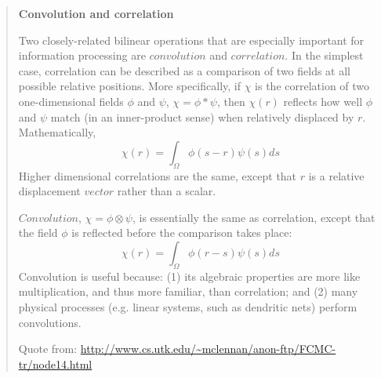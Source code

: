 
\begin{quote}
{\sffamily\bfseries
Convolution and correlation}

Two closely-related bilinear operations that are especially important
for information processing are $convolution$ and
$correlation$. In the simplest case, correlation can
be described as a comparison of two fields at all possible relative
positions. More specifically, if $\chi$
is the correlation of two one-dimensional fields $\phi$
and $\psi$, $\chi = \phi*\psi$, then $\chi(r)$ reflects how well 
$\phi$ and $\psi$ match (in an inner-product sense) when relatively displaced by
$r$. Mathematically, 
\[
\chi(r)=\int_{\Omega }^{} \phi(s-r)\psi (s)ds
\]
Higher dimensional correlations are the same, except that $r$ is
a relative displacement $vector$ rather than a scalar. 

$Convolution$, $\chi=\phi\otimes \psi$, is essentially the same as correlation, except that the field $\phi$ is reflected before the comparison takes place: 
\[
\chi(r)=\int_{\Omega }^{}  \phi(r-s)\psi  (s)ds
\]
Convolution is useful because: (1) its algebraic properties are more
like multiplication, and thus more familiar, than correlation; and (2)
many physical processes (e.g. linear systems, such as dendritic nets)
perform convolutions.

%
%
%
%
%


Quote from:
\url{http://www.cs.utk.edu/\~mclennan/anon-ftp/FCMC-tr/node14.html}
\end{quote} 

